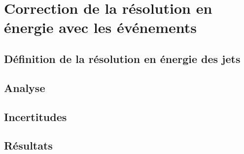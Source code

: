 \section{Correction de la résolution en énergie avec les événements \Gjets}\label{chapter-JERC-section-JER}

\subsection{Définition de la résolution en énergie des jets}\label{chapter-JERC-section-JER-subsec-JER_definition}

\subsection{Analyse}\label{chapter-JERC-section-JER-subsec-analyse}

\subsection{Incertitudes}\label{chapter-JERC-section-JER-subsec-uncertainties}

\subsection{Résultats}\label{chapter-JERC-section-JER-subsec-results}
